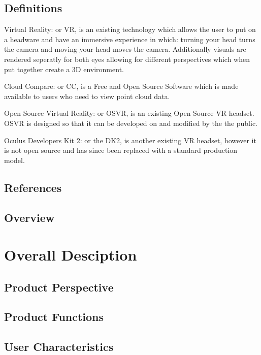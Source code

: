 \subsection{Definitions}

Virtual Reality: or VR, is an existing technology which allows the user to put on a headware and have an immersive experience in which:
turning your head turns the camera and
moving your head moves the camera.
Additionally visuals are rendered seperatly for both eyes allowing for different perspectives which when put together create a 3D environment.

Cloud Compare: or CC, is a Free and Open Source Software which is made available to users who need to view point cloud data.

Open Source Virtual Reality: or OSVR, is an existing Open Source VR headset. OSVR is designed so that it can be developed on and modified by the the public.

Oculus Developers Kit 2: or the DK2, is another existing VR headset, however it is not open source and has since been replaced with a standard production model.

\subsection{References}



\subsection{Overview}



\section{Overall Desciption}
\subsection{Product Perspective}



\subsection{Product Functions}

\subsection{User Characteristics}

